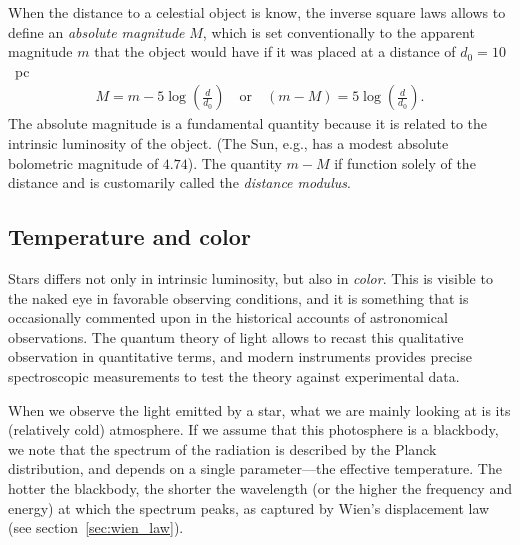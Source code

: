 When the distance to a celestial object is know, the inverse square laws allows
to define an \emph{absolute magnitude} $M$, which is set conventionally to the
apparent magnitude $m$ that the object would have if it was placed at a distance
of $d_0 = 10$~pc%
\begin{align}
  M = m - 5 \log \left( \frac{d}{d_0} \right) \quad\text{or}\quad
  (m - M) = 5 \log \left( \frac{d}{d_0} \right).
\end{align}
The absolute magnitude is a fundamental quantity because it is related to the
intrinsic luminosity of the object. (The Sun, e.g., has a modest absolute
bolometric magnitude of $4.74$). The quantity $m - M$ if function solely of the
distance and is customarily called the \emph{distance modulus}.



\subsection{Temperature and color}
\label{sec:stars_color}

Stars differs not only in intrinsic luminosity, but also in \emph{color}. This is
visible to the naked eye in favorable observing conditions, and it is something
that is occasionally commented upon in the historical accounts of astronomical
observations. The quantum theory of light
allows to recast this qualitative observation in quantitative terms, and modern
instruments provides precise spectroscopic measurements to test the theory against
experimental data.

When we observe the light emitted by a star, what we are mainly looking at is its
(relatively cold) atmosphere. If we assume that this photosphere is a
blackbody, we note that the spectrum of the radiation is described
by the Planck distribution, and depends on a single parameter---the effective temperature.
The hotter the blackbody, the shorter the wavelength (or the higher the frequency
and energy) at which the spectrum peaks, as captured by Wien's displacement law
(see section~\ref{sec:wien_law}).

